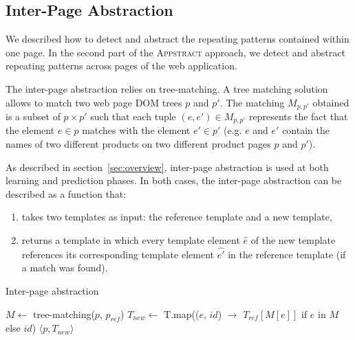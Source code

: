 \documentclass[sigconf,authordraft]{acmart}
\theoremstyle{definition}
\begin{document}


\subsection{Inter-Page Abstraction}\label{sec:inter}
We described how to detect and abstract the repeating patterns contained within one page. 
In the second part of the \textsc{Appstract} approach, we detect and abstract repeating patterns across pages of the web application.

The inter-page abstraction relies on tree-matching.
A tree matching solution allows to match two web page DOM trees $p$ and $p'$. 
The matching $M_{p, p'}$ obtained is a subset of  $p \times p'$ such that each tuple $(e, e') \in M_{p, p'}$ represents the fact that the element $e \in p$ matches with the element $e' \in p'$ (e.g. $e$ and $e'$ contain the names of two different products on two different product pages $p$ and $p'$).

As described in section~\ref{sec:overview}, inter-page abstraction is used at both learning and prediction phases. In both cases, the inter-page abstraction can be described as a function that:
\begin{enumerate}
    \item takes two templates as input: the reference template and a new template,
    \item returns a template in which every template element $\hat{e}$ of the new template references its corresponding template element $\hat{e'}$ in the reference template (if a match was found).
\end{enumerate}

\begin{algorithm}
    \caption{Inter-page abstraction}\label{alg:inter-page}
    \begin{algorithmic}[1]
          \State $M \gets$ tree-matching($p$, $p_{ref}$)
          \State $T_{new} \gets$ T.map(($e$, $id$) $\to$ $T_{ref}[M[e]]$ if $e$ in $M$ else $id$)
          \State \Return $\langle p, T_{new} \rangle$
      \EndFunction
    \end{algorithmic}
\end{algorithm}
\end{document}
